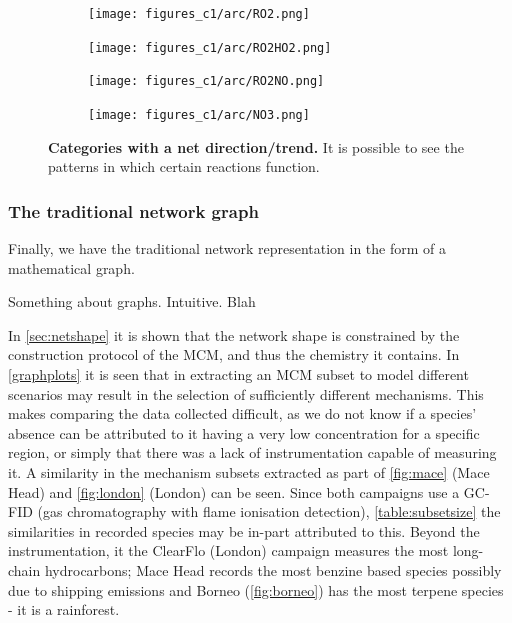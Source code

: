 \begin{figure}[H]
     \centering
      \begin{subfigure}[b]{.4\textwidth}
         \centering
         \texttt{[image: figures\_c1/arc/RO2.png]}
         \caption{ }
         \label{fig:ro2}
     \end{subfigure}
     \begin{subfigure}[b]{.4\textwidth}
        \centering
        \texttt{[image: figures\_c1/arc/RO2HO2.png]}
        \caption{}
        \label{fig:ro2ho2}
    \end{subfigure}
    \begin{subfigure}[b]{.4\textwidth}
       \centering
       \texttt{[image: figures\_c1/arc/RO2NO.png]}
       \caption{}
       \label{fig:ro2no}
   \end{subfigure}
   \begin{subfigure}[b]{.4\textwidth}
      \centering
      \texttt{[image: figures\_c1/arc/NO3.png]}
      \caption{ }
      \label{fig:no3}
  \end{subfigure}
\caption{\textbf{Categories with a net direction/trend.} It is possible to see the patterns in which certain reactions function.  }
  \label{fig:ro2arc}
\end{figure}



\subsubsection{The traditional network graph}

Finally, we have the traditional network representation in the form of a mathematical graph. 

Something about graphs. Intuitive. Blah


In \autoref{sec:netshape} it is shown that the network shape is constrained by the construction protocol of the MCM, and thus the chemistry it contains. In \autoref{graphplots} it is seen that in extracting an MCM subset to model different scenarios may result in the selection of sufficiently different mechanisms. This makes comparing the data collected difficult, as we do not know if a species' absence can be attributed to it having a very low concentration for a specific region, or simply that there was a lack of instrumentation capable of measuring it. A similarity in the mechanism subsets extracted as part of \autoref{fig:mace} (Mace Head) and \autoref{fig:london} (London) can be seen. Since both campaigns use a GC-FID (gas
chromatography with flame ionisation detection), \autoref{table:subsetsize} the similarities in recorded species may be in-part attributed to this. Beyond the instrumentation, it the ClearFlo (London) campaign measures the most long-chain hydrocarbons; Mace Head records the most benzine based species possibly due to shipping emissions and Borneo (\autoref{fig:borneo}) has the most terpene species - it is a rainforest. 




